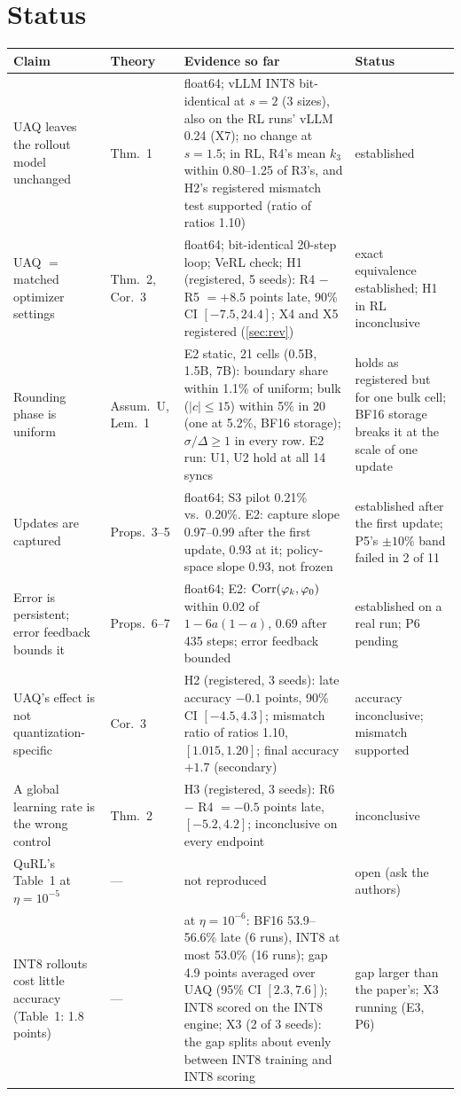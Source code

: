 \documentclass[11pt]{article}
\begin{document}
\section{Status}\label{sec:status}
{\small
\begin{xltabular}{\linewidth}{@{}L l L L@{}}
\toprule
Claim & Theory & Evidence so far & Status\\
\midrule
\endhead
UAQ leaves the rollout model unchanged & Thm.~1 & float64; vLLM INT8 bit-identical at $s=2$ (3 sizes), also on the RL runs' vLLM 0.24 (X7); no change at $s=1.5$; in RL, R4's mean $k_3$ within 0.80--1.25 of R3's, and H2's registered mismatch test supported (ratio of ratios 1.10) & established\\
UAQ $=$ matched optimizer settings & Thm.~2, Cor.~3 & float64; bit-identical 20-step loop; VeRL check; H1 (registered, 5 seeds): R4 $-$ R5 $=+8.5$ points late, 90\% CI $[-7.5, 24.4]$; X4 and X5 registered (\cref{sec:rev}) & exact equivalence established; H1 in RL inconclusive\\
Rounding phase is uniform & Assum.~U, Lem.~1 & E2 static, 21 cells (0.5B, 1.5B, 7B): boundary share within 1.1\% of uniform; bulk ($|c|\le15$) within 5\% in 20 (one at 5.2\%, BF16 storage); $\sigma/\Delta\ge1$ in every row. E2 run: U1, U2 hold at all 14 syncs & holds as registered but for one bulk cell; BF16 storage breaks it at the scale of one update\\
Updates are captured & Props.~3--5 & float64; S3 pilot 0.21\% vs.\ 0.20\%. E2: capture slope 0.97--0.99 after the first update, 0.93 at it; policy-space slope 0.93, not frozen & established after the first update; P5's $\pm10\%$ band failed in 2 of 11\\
Error is persistent; error feedback bounds it & Props.~6--7 & float64; E2: $\operatorname{Corr}(\varphi_k,\varphi_0)$ within 0.02 of $1-6a(1-a)$, 0.69 after 435 steps; error feedback bounded & established on a real run; P6 pending\\
UAQ's effect is not quantization-specific & Cor.~3 & H2 (registered, 3 seeds): late accuracy $-0.1$ points, 90\% CI $[-4.5, 4.3]$; mismatch ratio of ratios 1.10, $[1.015, 1.20]$; final accuracy $+1.7$ (secondary) & accuracy inconclusive; mismatch supported\\
A global learning rate is the wrong control & Thm.~2 & H3 (registered, 3 seeds): R6 $-$ R4 $=-0.5$ points late, $[-5.2, 4.2]$; inconclusive on every endpoint & inconclusive\\
QuRL's Table~1 at $\eta=10^{-5}$ & --- & not reproduced & open (ask the authors)\\
INT8 rollouts cost little accuracy (Table~1: 1.8 points) & --- & at $\eta=10^{-6}$: BF16 53.9--56.6\% late (6 runs), INT8 at most 53.0\% (16 runs); gap 4.9 points averaged over UAQ (95\% CI $[2.3, 7.6]$); INT8 scored on the INT8 engine; X3 (2 of 3 seeds): the gap splits about evenly between INT8 training and INT8 scoring & gap larger than the paper's; X3 running (E3, P6)\\
\bottomrule
\end{xltabular}}


\nocite{yao2025flashrl,hilton2022batch}



\end{document}
